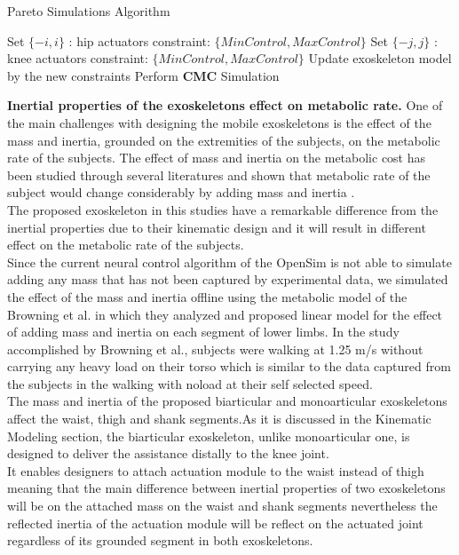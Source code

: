 \documentclass[10pt,letterpaper]{article}
\begin{document}
\begin{algorithm}\label{Algorithm_Pareto_simulation}
	\caption{Pareto Simulations Algorithm}\label{Pareto_Algorithm}
	\begin{algorithmic}[1]
		\State Set $\{-i,i\}$ : hip actuators constraint: $\{Min Control, Max Control\}$
		\State Set $\{-j,j\}$ : knee actuators constraint: $\{Min Control, Max Control\}$
		\State Update exoskeleton model by the new constraints
		\State Perform \textbf{CMC} Simulation
		\EndFor
		\EndFor
	\end{algorithmic}
\end{algorithm}
\textbf{Inertial properties of the exoskeletons effect on metabolic rate.} One of the main challenges with designing the mobile exoskeletons is the effect of the mass and inertia, grounded on the extremities of the subjects, on the metabolic rate of the subjects. The effect of mass and inertia on the metabolic cost has been studied through several literatures \cite{133,134} and shown that metabolic rate of the subject would change considerably by adding mass and inertia \cite{133,134,135}.\\
The proposed exoskeleton in this studies have a remarkable difference from the inertial properties due to their kinematic design and it will result in different effect on the metabolic rate of the subjects.\\
Since the current neural control algorithm of the OpenSim is not able to simulate adding any mass that has not been captured by experimental data, we simulated the effect of the mass and inertia offline using the metabolic model of the Browning et al.\cite{133} in which they analyzed and proposed linear model for the effect of adding mass and inertia on each segment of lower limbs. In the study accomplished by Browning et al.\cite{133}, subjects were walking at 1.25 m/s without carrying any heavy load on their torso which is similar to the data captured from the subjects in the walking with noload at their self selected speed\cite{93}.\\
The mass and inertia of the proposed biarticular and monoarticular exoskeletons affect the waist, thigh and shank segments.As it is discussed in the Kinematic Modeling section, the biarticular exoskeleton, unlike monoarticular one, is designed to deliver the assistance distally to the knee joint.\\
It enables designers to attach actuation module to the waist instead of thigh meaning that the main difference between inertial properties of two exoskeletons will be on the attached mass on the waist and shank segments nevertheless the reflected inertia of the actuation module will be reflect on the actuated joint regardless of its grounded segment in both exoskeletons.\\
\end{document}
